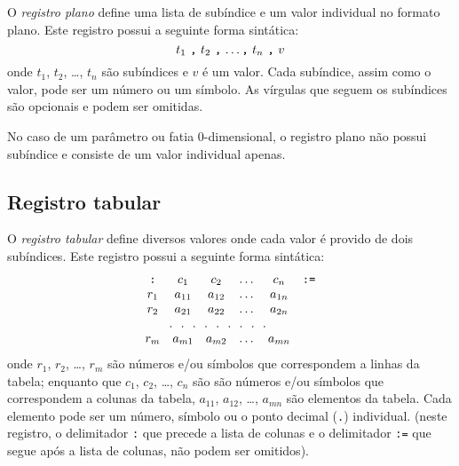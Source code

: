 \documentclass[11pt, brazil]{report}
\begin{document}
O {\it registro plano} define uma lista de subíndice e um valor individual
no formato plano. Este registro possui a seguinte forma sintática:
$$\mbox{$t_1$ {\tt,} $t_2$ {\tt,} \dots {\tt,} $t_n$ {\tt,} $v$}$$
onde $t_1$, $t_2$, \dots, $t_n$ são subíndices e $v$ é um valor.
Cada subíndice, assim como o valor, pode ser um número ou um símbolo. As
vírgulas que seguem os subíndices são opcionais e podem ser omitidas.

No caso de um parâmetro ou fatia 0-dimensional, o registro plano não possui
subíndice e consiste de um valor individual apenas.


%

\subsection{Registro tabular}

O {\it registro tabular} define diversos valores onde cada valor é provido
de dois subíndices. Este registro possui a seguinte forma sintática:
$$\begin{array}{cccccc}
\mbox{{\tt:}}&c_1&c_2&\dots&c_n&\mbox{{\tt:=}}\\
r_1&a_{11}&a_{12}&\dots&a_{1n}&\\
r_2&a_{21}&a_{22}&\dots&a_{2n}&\\
\multicolumn{5}{c}{.\ \ .\ \ .\ \ .\ \ .\ \ .\ \ .\ \ .\ \ .}&\\
r_m&a_{m1}&a_{m2}&\dots&a_{mn}&\\
\end{array}$$
onde $r_1$, $r_2$, \dots, $r_m$ são números e/ou símbolos
que correspondem a linhas da tabela; enquanto que $c_1$, $c_2$, \dots, $c_n$ são
são números e/ou símbolos que correspondem a colunas da tabela, $a_{11}$,
$a_{12}$, \dots, $a_{mn}$ são elementos da tabela. Cada elemento pode ser
um número, símbolo ou o ponto decimal ({\tt.}) individual. (neste registro,
o delimitador {\tt:} que precede a lista de colunas e o delimitador
{\tt:=} que segue após a lista de colunas, não podem ser omitidos).
\end{document}
